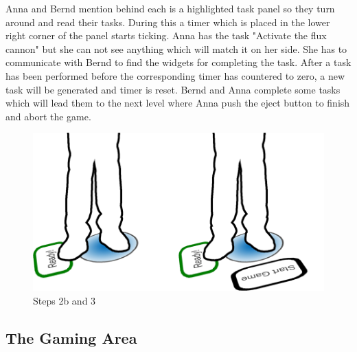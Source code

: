 \documentclass{sigchi}
\begin{document}
Anna and Bernd mention behind each is a highlighted task panel so they turn around and read their tasks. During this a timer which is placed in the lower right corner of the panel starts ticking. Anna has the task "Activate the flux cannon" but she can not see anything which will match it on her side. She has to communicate with Bernd to find the widgets for completing the task. After a task has been performed before the corresponding timer has countered to zero, a new task will be generated and timer is reset. Bernd and Anna complete some tasks which will lead them to the next level where Anna push the eject button to finish and abort the game.

\begin{figure}[H]
\centering
\includegraphics[width=0.9\columnwidth]{walkthrough/klein/beamingarea2b+3}
\caption{Steps 2b and 3}
\label{fig:gamingArea}
\end{figure}




\subsection{The Gaming Area}
\end{document}
